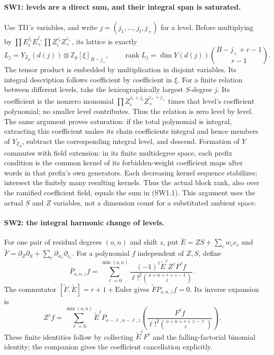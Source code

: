 \documentclass[11pt,a4paper]{article}
\numberwithin{equation}{section}
\theoremstyle{remark}\newtheorem{remark}[theorem]{Remark}
\begin{document}
\paragraph{SW1: levels are a direct sum, and their integral span is saturated.}
Use TI1's variables, and write
$j=(j_1,\ldots,j_t,j_+)$ for a level.  Before multiplying by
$\prod E_i^{j_i}E_+^{j_+}\prod Z_i^{z_i}Z_+^{z_+}$, its lattice is exactly
\[
 L_j=Y_{\mathbb Z_p}(d(j))\otimes
           \mathbb Z_p[\xi]_{B-j_+},\qquad
 \operatorname{rank}L_j=\dim Y(d(j))\binom{B-j_++r-1}{r-1}.
 \tag{SW1.1}
\]
The tensor product is embedded by multiplication in disjoint variables.
Its integral description follows coefficient by coefficient in $\xi$.
For a finite relation between different levels, take the lexicographically
largest $S$-degree $j$. Its coefficient is the nonzero monomial
$\prod Z_i^{z_i+j_i}Z_+^{z_++j_+}$ times that level's coefficient polynomial;
no smaller level contributes. Thus the relation is zero level by level.
The same argument proves saturation: if the total polynomial is integral,
extracting this coefficient makes its chain coefficients integral and hence
members of $Y_{\mathbb Z_p}$, subtract the corresponding integral level,
and descend. Formation of $Y$ commutes with field extension: in its finite
multidegree space, each prefix condition is the common kernel of its
forbidden-weight coefficient maps after words in that prefix's own
generators. Each decreasing kernel sequence stabilizes; intersect the
finitely many resulting kernels. Thus the actual block
rank, also over the ramified coefficient field, equals the sum in (SW1.1).
This argument uses the actual $S$ and $Z$ variables, not a dimension count
for a substituted ambient space.

\paragraph{SW2: the integral harmonic change of levels.}
For one pair of residual degrees $(o,n)$ and shift $z$, put
$\widetilde E=ZS+\sum_c w_ce_c$ and
$\widetilde F=\partial_Z\partial_S+\sum_c\partial_{w_c}\partial_{e_c}$.
For a polynomial $f$ independent of $Z,S$, define
\[
 P_{o,n,z}f=\sum_{\ell=0}^{\min(o,n)}
 \frac{(-1)^\ell\widetilde E^\ell Z^zF^\ell f}
 {\ell!^2\binom{o+n+r+z-1}{\ell}}.
 \tag{SW2.1}
\]
The commutator $[\widetilde F,\widetilde E]
=r+1+\mathrm{Euler}$ gives
$\widetilde F P_{o,n,z}f=0$. Its inverse expansion is
\[
 Z^zf=\sum_{\ell=0}^{\min(o,n)}
 \widetilde E^\ell P_{o-\ell,n-\ell,z}
 \left(\frac{F^\ell f}
 {\ell!^2\binom{o+n+r+z-\ell}{\ell}}\right).
 \tag{SW2.2}
\]
These finite identities follow by collecting $\widetilde E^\ell F^\ell$
and the falling-factorial binomial identity; the companion gives the
coefficient cancellation explicitly.
\end{document}
